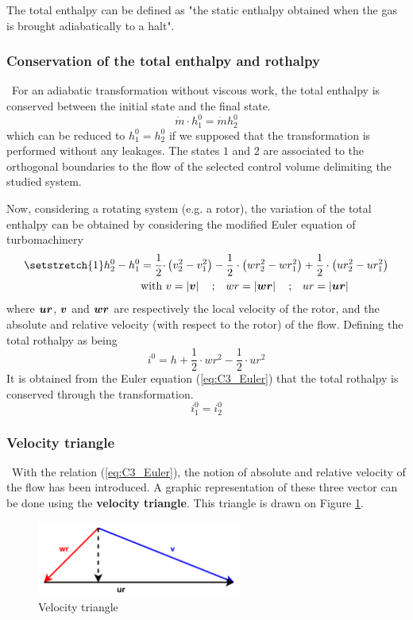 The total enthalpy can be defined as "the static enthalpy obtained when the gas is brought adiabatically to a halt"\citep{Hillewaert2019}.


\subsubsection{Conservation of the total enthalpy and rothalpy}
\quad\, For an adiabatic transformation without viscous work, the total enthalpy is conserved between the initial state and the final state.
\begin{equation}
\dot{m}\cdot h_1^0 = \dot{m} h_2^0 \label{eq:C3_hcons}
\end{equation}
which can be reduced to $h_1^0 = h_2^0$ if we supposed that the transformation is performed without any leakages. The states $1$ and $2$ are associated to the orthogonal boundaries to the flow of the selected control volume delimiting the studied system. 

Now, considering a rotating system (e.g. a rotor), the variation of the total enthalpy can be obtained by considering the modified Euler equation of turbomachinery
\begin{align}
\setstretch{1}
h_2^0 - h_1^0 = \frac{1}{2}\cdot &\left(v_2^2 - v_1^2\right) - \frac{1}{2}\cdot \left(wr_2^2 - wr_1^2\right) + \frac{1}{2}\cdot \left(ur_2^2 - ur_1^2\right)\label{eq:C3_Euler}\\
\text{with }& v = \left|\vect{v}\right|\quad\text{;}\quad  wr = \left|\vect{wr}\right|\quad\text{;}\quad ur= \left|\vect{ur}\right|\nonumber
\end{align}
where $\boldsymbol{ur}$, $\boldsymbol{v}$ and $\boldsymbol{wr}$ are respectively the local velocity of the rotor, and the absolute and relative velocity (with respect to the rotor) of the flow. Defining the total rothalpy as being 
\begin{equation}
i^0 = h + \frac{1}{2}\cdot wr^2 - \frac{1}{2}\cdot ur^2 \label{eq:C3_i0}
\end{equation}
It is obtained from the Euler equation (\ref{eq:C3_Euler}) that the total rothalpy is conserved through the transformation.
\begin{equation}
i_1^0 = i_2^0 \label{eq:C3_icons}
\end{equation}
\subsubsection{Velocity triangle}
\quad\, With the relation (\ref{eq:C3_Euler}), the notion of absolute and relative velocity of the flow has been introduced. A graphic representation of these three vector can be done using the \textbf{velocity triangle}. This triangle is drawn on Figure \ref{fig:C3_vtriang}.
\begin{figure}[h]
\centering
\includegraphics[width=0.6\textwidth]{Vtriangle.png}
\caption{Velocity triangle}
\label{fig:C3_vtriang}
\end{figure}

